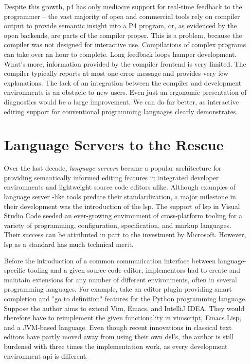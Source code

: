 Despite this growth, \acrshort{p4} has only mediocre support for real-time
feedback to the programmer -- the vast majority of open and commercial tools
rely on compiler output to provide semantic insight into a P4
program\cite{p4insight}, or, as evidenced by the open backends, are parts of the
compiler proper. This is a problem, because the compiler was not designed for
interactive use. Compilations of complex programs can take over an hour to
complete. Long feedback loops hamper development. What's more, information
provided by the compiler frontend is very limited. The compiler typically
reports at most one error message and provides very few explanations. The lack
of an integration between the compiler and development environments is an
obstacle to new users. Even just an ergonomic presentation of diagnostics would
be a large improvement. We can do far better, as interactive editing support for
conventional programming languages clearly demonstrates.


\section*{Language Servers to the Rescue}

Over the last decade,
\emph{language servers} became a popular architecture\cite{barros2022editing}
for providing semantically informed editing features in integrated developer
environments and lightweight source code editors alike. Although examples of
language server -like tools predate their standardization\cite{bour2018merlin},
a major milestone in their development was the introduction of the
\acrfull{lsp}. The support of \acrshort{lsp} in Visual Studio Code seeded an
ever-growing environment of cross-platform tooling for a variety of programming,
configuration, specification, and markup languages. Their success can be
attributed in part to the investment by Microsoft. However, \acrshort{lsp} as a
standard has much technical merit.

Before the introduction of a common communication interface between
language-specific tooling and a given source code editor, implementors had to
create and maintain extensions for any number of different environments, often
in several programming languages. For example, take an editor plugin providing
smart completion and "go to definition" features for the Python programming
language. Suppose the author aims to extend Vim, Emacs, and IntelliJ IDEA. They
would therefore have to reimplement the given functionality in vimscript, Emacs
Lisp, and a JVM-based language. Even though recent innovations in classical text
editors have partly moved away from using their own
\acrshort{dsl}'s, the author is still burdened with three times the
implementation work, as every development environment \acrshort{api} is
different.

